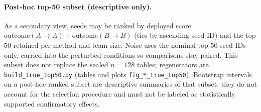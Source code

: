 \paragraph{Post-hoc top-50 subset (descriptive only).}
As a secondary view, seeds may be ranked by deployed score
\(\mathrm{outcome}(A{\to}A)+\mathrm{outcome}(B{\to}B)\) (ties by ascending
seed ID) and the top 50 retained per method and team size. Noise uses the
nominal top-50 seed IDs only, carried into the perturbed conditions so
comparisons stay paired. This subset does not replace the sealed \(n=128\)
tables; regenerators are \texttt{build\_true\_top50.py} (tables and plots
\texttt{fig\_*\_true\_top50}).
Bootstrap intervals on a post-hoc ranked subset are descriptive summaries of
that subset; they do not account for the selection procedure and must not be
labeled as statistically supported confirmatory effects.

